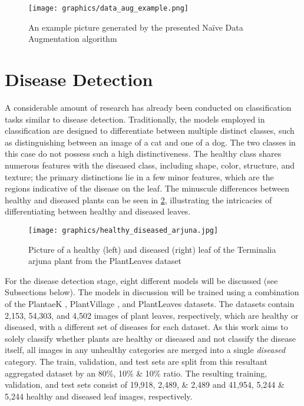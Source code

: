 \documentclass[draft,final]{vutinfth} %
\begin{document}
\begin{figure}[h]
    \centering
    \texttt{[image: graphics/data\_aug\_example.png]}
    \caption{An example picture generated by the presented Na\"ive Data Augmentation algorithm}
    \label{fig:data_aug_example}
\end{figure}

\section{Disease Detection} \label{sec:method_disease}
A considerable amount of research has already been conducted on classification tasks similar to disease detection. Traditionally, the models employed in classification are designed to differentiate between multiple distinct classes, such as distinguishing between an image of a cat and one of a dog. The two classes in this case do not possess such a high distinctiveness. The healthy class shares numerous features with the diseased class, including shape, color, structure, and texture; the primary distinctions lie in a few minor features, which are the regions indicative of the disease on the leaf. The minuscule differences between healthy and diseased plants can be seen in \ref{fig:healthy_diseased_arjun}, illustrating the intricacies of differentiating between healthy and diseased leaves.


\begin{figure}
    \centering
    \texttt{[image: graphics/healthy\_diseased\_arjuna.jpg]}
    \caption{Picture of a healthy (left) and diseased (right) leaf of the Terminalia arjuna plant from the PlantLeaves dataset \cite{chouhan_database_2019}}
    \label{fig:healthy_diseased_arjun}
\end{figure}

For the disease detection stage, eight different models will be discussed (see Subsections below). The models in discussion will be trained using a combination of the PlantaeK \cite{kour_plantaek_2019}, PlantVillage \cite{hughes_open_2016}, and PlantLeaves \cite{chouhan_database_2019} datasets. The datasets contain 2,153, 54,303, and 4,502 images of plant leaves, respectively, which are healthy or diseased, with a different set of diseases for each dataset. As this work aims to solely classify whether plants are healthy or diseased and not classify the disease itself, all images in any unhealthy categories are merged into a single \textit{diseased} category. The train, validation, and test sets are split from this resultant aggregated dataset by an 80\%, 10\% \& 10\% ratio. The resulting training, validation, and test sets consist of 19,918, 2,489, \& 2,489 and 41,954, 5,244 \& 5,244 healthy and diseased leaf images, respectively.
\end{document}
